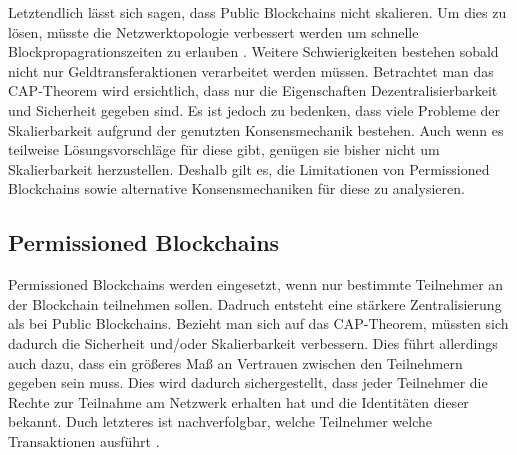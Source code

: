 Letztendlich lässt sich sagen, dass Public Blockchains nicht skalieren. Um dies zu lösen, müsste die Netzwerktopologie verbessert werden um schnelle Blockpropagrationszeiten zu erlauben \cite{SchererPerformanceScalabilityBlockchain2017}. Weitere Schwierigkeiten bestehen sobald nicht nur Geldtransferaktionen verarbeitet werden müssen. Betrachtet man das CAP-Theorem wird ersichtlich, dass nur die Eigenschaften Dezentralisierbarkeit und Sicherheit gegeben sind. Es ist jedoch zu bedenken, dass viele Probleme der Skalierbarkeit aufgrund der genutzten Konsensmechanik bestehen. Auch wenn es teilweise Lösungsvorschläge für diese gibt, genügen sie bisher nicht um Skalierbarkeit herzustellen. Deshalb gilt es, die Limitationen von Permissioned Blockchains sowie alternative Konsensmechaniken für diese zu analysieren.


\subsection{Permissioned Blockchains}
Permissioned Blockchains werden eingesetzt, wenn nur bestimmte Teilnehmer an der Blockchain teilnehmen sollen. Dadruch entsteht eine stärkere Zentralisierung als bei Public Blockchains. Bezieht man sich auf das CAP-Theorem, müssten sich dadurch die Sicherheit und/oder Skalierbarkeit verbessern. Dies führt allerdings auch dazu, dass ein größeres Maß an Vertrauen zwischen den Teilnehmern gegeben sein muss. Dies wird dadurch sichergestellt, dass jeder Teilnehmer die Rechte zur Teilnahme am Netzwerk erhalten hat und die Identitäten dieser bekannt. Duch letzteres ist nachverfolgbar, welche Teilnehmer welche Transaktionen ausführt \cite{SchererPerformanceScalabilityBlockchain2017}.

